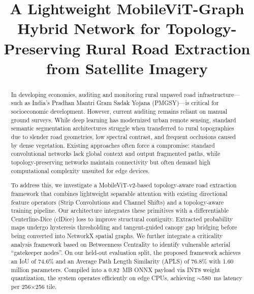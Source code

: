 \documentclass[conference]{IEEEtran}
\begin{document}
\title{A Lightweight MobileViT-Graph Hybrid Network for Topology-Preserving Rural Road Extraction from Satellite Imagery}

\author{
}

\maketitle

\begin{abstract}
In developing economies, auditing and monitoring rural unpaved road infrastructure—such as India's Pradhan Mantri Gram Sadak Yojana (PMGSY)—is critical for socioeconomic development. However, current auditing remains reliant on manual ground surveys. While deep learning has modernized urban remote sensing, standard semantic segmentation architectures struggle when transferred to rural topographies due to slender road geometries, low spectral contrast, and frequent occlusions caused by dense vegetation. Existing approaches often force a compromise: standard convolutional networks lack global context and output fragmented paths, while topology-preserving networks maintain connectivity but often demand high computational complexity unsuited for edge devices.

To address this, we investigate a MobileViT-v2-based topology-aware road extraction framework that combines lightweight separable attention with existing directional feature operators (Strip Convolutions and Channel Shifts) and a topology-aware training pipeline. Our architecture integrates these primitives with a differentiable Centerline-Dice (clDice) loss to improve structural contiguity. Extracted probability maps undergo hysteresis thresholding and tangent-guided canopy gap bridging before being converted into NetworkX spatial graphs. We further integrate a criticality analysis framework based on Betweenness Centrality to identify vulnerable arterial ``gatekeeper nodes''. On our held-out evaluation split, the proposed framework achieves an IoU of 74.6\% and an Average Path Length Similarity (APLS) of 76.8\% with 1.60 million parameters. Compiled into a 0.82~MB ONNX payload via INT8 weight quantization, the system operates efficiently on edge CPUs, achieving $\sim$580~ms latency per 256$\times$256 tile.
\end{abstract}
\end{document}
